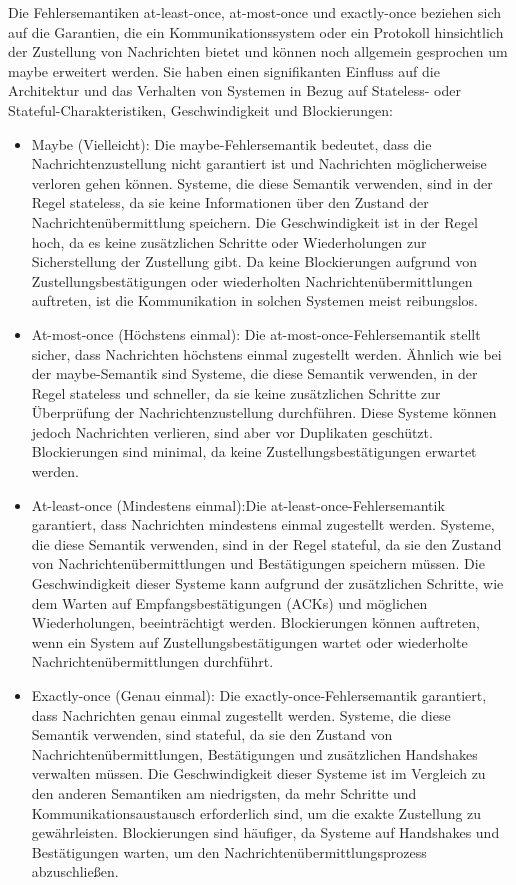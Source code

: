 Die Fehlersemantiken at-least-once, at-most-once und exactly-once beziehen sich auf die Garantien, die ein Kommunikationssystem oder ein Protokoll hinsichtlich der Zustellung von Nachrichten bietet und können noch allgemein gesprochen um maybe erweitert werden. Sie haben einen signifikanten Einfluss auf die Architektur und das Verhalten von Systemen in Bezug auf Stateless- oder Stateful-Charakteristiken, Geschwindigkeit und Blockierungen:
\begin{itemize}
\item  Maybe (Vielleicht): Die maybe-Fehlersemantik bedeutet, dass die Nachrichtenzustellung nicht garantiert ist und Nachrichten möglicherweise verloren gehen können. Systeme, die diese Semantik verwenden, sind in der Regel stateless, da sie keine Informationen über den Zustand der Nachrichtenübermittlung speichern. Die Geschwindigkeit ist in der Regel hoch, da es keine zusätzlichen Schritte oder Wiederholungen zur Sicherstellung der Zustellung gibt. Da keine Blockierungen aufgrund von Zustellungsbestätigungen oder wiederholten Nachrichtenübermittlungen auftreten, ist die Kommunikation in solchen Systemen meist reibungslos.
\item At-most-once (Höchstens einmal): Die at-most-once-Fehlersemantik stellt sicher, dass Nachrichten höchstens einmal zugestellt werden. Ähnlich wie bei der maybe-Semantik sind Systeme, die diese Semantik verwenden, in der Regel stateless und schneller, da sie keine zusätzlichen Schritte zur Überprüfung der Nachrichtenzustellung durchführen. Diese Systeme können jedoch Nachrichten verlieren, sind aber vor Duplikaten geschützt. Blockierungen sind minimal, da keine Zustellungsbestätigungen erwartet werden.
\item At-least-once (Mindestens einmal):Die at-least-once-Fehlersemantik garantiert, dass Nachrichten mindestens einmal zugestellt werden. Systeme, die diese Semantik verwenden, sind in der Regel stateful, da sie den Zustand von Nachrichtenübermittlungen und Bestätigungen speichern müssen. Die Geschwindigkeit dieser Systeme kann aufgrund der zusätzlichen Schritte, wie dem Warten auf Empfangsbestätigungen (ACKs) und möglichen Wiederholungen, beeinträchtigt werden. Blockierungen können auftreten, wenn ein System auf Zustellungsbestätigungen wartet oder wiederholte Nachrichtenübermittlungen durchführt.
\item Exactly-once (Genau einmal): Die exactly-once-Fehlersemantik garantiert, dass Nachrichten genau einmal zugestellt werden. Systeme, die diese Semantik verwenden, sind stateful, da sie den Zustand von Nachrichtenübermittlungen, Bestätigungen und zusätzlichen Handshakes verwalten müssen. Die Geschwindigkeit dieser Systeme ist im Vergleich zu den anderen Semantiken am niedrigsten, da mehr Schritte und Kommunikationsaustausch erforderlich sind, um die exakte Zustellung zu gewährleisten. Blockierungen sind häufiger, da Systeme auf Handshakes und Bestätigungen warten, um den Nachrichtenübermittlungsprozess abzuschließen.
\end{itemize}
